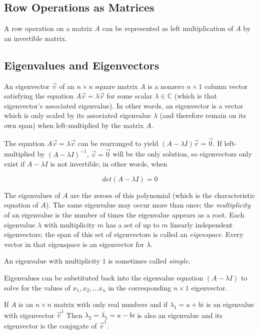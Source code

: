 \subsection{Row Operations as Matrices}

A row operation on a matrix $A$ can be represented as left multiplication of $A$ by an invertible matrix.

\subsection{Eigenvalues and Eigenvectors}

An eigenvector $\vec{v}$ of an $n\times n$ square matrix $A$ is a nonzero $n\times 1$ column vector satisfying the equation $A\vec{v} =\lambda\vec{v}$ for some scalar $\lambda \in \mathbb{C}$ (which is that eigenvector's associated eigenvalue). In other words, an eigenvector is a vector which is only scaled by its associated eigenvalue $\lambda$ (and therefore remain on its own span) when left-multiplied by the matrix $A$.

The equation $A\vec{v} = \lambda\vec{v}$ can be rearranged to yield $(A - \lambda I)\vec{v} = \vec{0}$. If left-multiplied by $(A - \lambda I)^{-1}$, $\vec{v}=\vec{0}$ will be the only solution, so eigenvectors only exist if $A - \lambda I$ is not invertible; in other words, when

$$det(A-\lambda I) = 0$$


The eigenvalues of $A$ are the zeroes of this polynomial (which is the characteristic equation of $A$). The same eigenvalue may occur more than once; the \textit{multiplicity} of an eigenvalue is the number of times the eigenvalue appears as a root. Each eigenvalue $\lambda$ with multiplicity $m$ has a set of up to $m$ linearly independent eigenvectors; the span of this set of eigenvectors is called an \textit{eigenspace}. Every vector in that eigenspace is an eigenvector for $\lambda$.

	An eigenvalue with multiplicity $1$ is sometimes called \textit{simple}.

Eigenvalues can be substituted back into the eigenvalue equation $(A-\lambda I)$ to solve for the values of $x_{1}, x_{2}, \ldots x_{n}$ in the corresponding $n \times 1$ eigenvector.

If $A$ is an $n \times n$ matrix with only real numbers and if $\lambda_{1} = a + bi$ is an eigenvalue with eigenvector $\vec{v}^{1}$ Then $\lambda_{2} = \overline{\lambda_{1}} = a - bi$ is also an eigenvalue and its eigenvector is the conjugate of $\vec{v}^{1}$.

